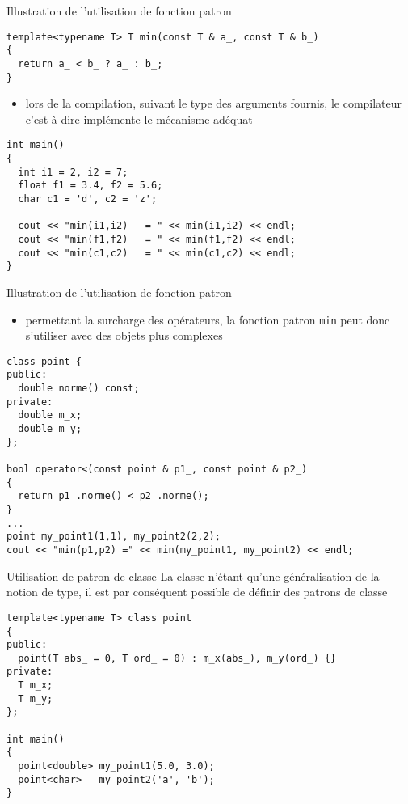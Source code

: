 \documentclass[c]{beamer}
\begin{document}
\begin{frame}[fragile,label={sec:orgheadline3}]{Illustration de l'utilisation de fonction patron}
 \begin{verbatim}
template<typename T> T min(const T & a_, const T & b_)
{
  return a_ < b_ ? a_ : b_;
}
\end{verbatim}

\begin{itemize}
\item lors de la compilation, suivant le type des arguments fournis, le compilateur
 c'est-à-dire implémente le mécanisme adéquat
\end{itemize}

\pause
\begin{verbatim}
int main()
{
  int i1 = 2, i2 = 7;
  float f1 = 3.4, f2 = 5.6;
  char c1 = 'd', c2 = 'z';

  cout << "min(i1,i2)   = " << min(i1,i2) << endl;
  cout << "min(f1,f2)   = " << min(f1,f2) << endl;
  cout << "min(c1,c2)   = " << min(c1,c2) << endl;
}
\end{verbatim}
\end{frame}

\begin{frame}[fragile,label={sec:orgheadline4}]{Illustration de l'utilisation de fonction patron}
 \begin{itemize}
\item \Cpp permettant la surcharge des opérateurs, la fonction patron \texttt{min} peut
donc s'utiliser avec des objets plus complexes
\end{itemize}

\begin{verbatim}
class point {
public:
  double norme() const;
private:
  double m_x;
  double m_y;
};

bool operator<(const point & p1_, const point & p2_)
{
  return p1_.norme() < p2_.norme();
}
...
point my_point1(1,1), my_point2(2,2);
cout << "min(p1,p2) =" << min(my_point1, my_point2) << endl;
\end{verbatim}
\end{frame}

\begin{frame}[fragile,label={sec:orgheadline5}]{Utilisation de patron de classe}
 La classe n'étant qu'une généralisation de la notion de type, il est par
conséquent possible de définir des patrons de classe

\begin{verbatim}
template<typename T> class point
{
public:
  point(T abs_ = 0, T ord_ = 0) : m_x(abs_), m_y(ord_) {}
private:
  T m_x;
  T m_y;
};

int main()
{
  point<double> my_point1(5.0, 3.0);
  point<char>   my_point2('a', 'b');
}
\end{verbatim}
\end{frame}
\end{document}
